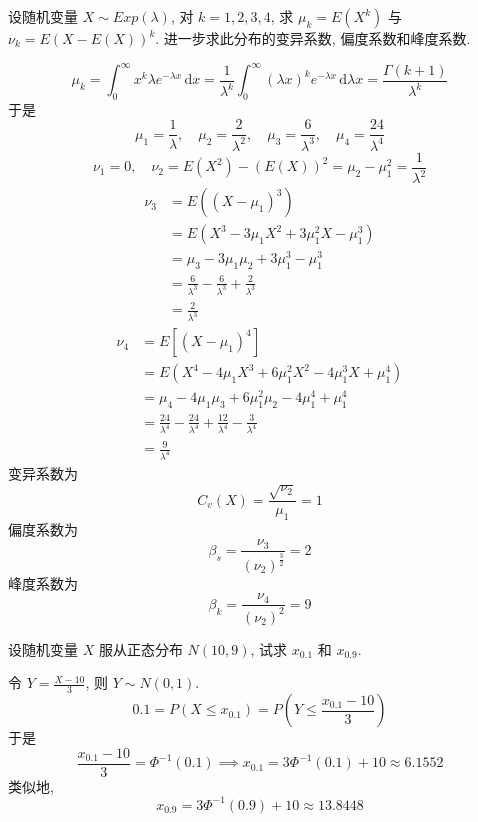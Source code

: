 \documentclass[../main.tex]{subfiles}
\begin{document}
\begin{exercise}{}{}
设随机变量 $X \sim Exp(\lambda)$, 对 $k=1,2,3,4$, 求 $\mu_k = E(X^k)$ 与 $\nu_k = E(X - E(X))^k$. 进一步求此分布的变异系数, 偏度系数和峰度系数.
\end{exercise}
 \begin{solution}
    \[
 \mu _{k}=  \int_{0}^{\infty}x^{k}  \lambda e^{-\lambda x}\,\mathrm{d} x= \frac{1 }{ \lambda ^{k} } \int_{0}^{\infty}\left(  \lambda x \right)^{k}e^{- \lambda x}\,\mathrm{d}  \lambda x=  \frac{ \Gamma \left( k+ 1 \right)  }{  \lambda ^{k}}   
 \]于是 \[
 \mu _1 = \frac{1 }{ \lambda  },\quad \mu _2 = \frac{2 }{ \lambda ^{2} },\quad \mu _3 = \frac{6 }{ \lambda ^{3} },\quad \mu _4 = \frac{24 }{ \lambda ^{4} }    
 \] \[
 \nu _1 = 0,\quad \nu _2 = E\left( X^{2} \right)-\left( E\left( X \right)  \right)^{2}= \mu _2 -\mu _1 ^{2}= \frac{1 }{ \lambda ^{2} }   
 \] \[
\begin{aligned}
 \nu  _3& = E\left( \left( X-\mu _1  \right)^{3}  \right) \\ 
  &= E\left( X^{3}-3\mu _1 X^{2}+ 3\mu _1 ^{2}X - \mu _1 ^{3}\right)\\ 
   &= \mu _3 -3\mu _1 \mu _2 + 3\mu _1 ^{3} -\mu _1 ^{3}\\ 
    &= \frac{6 }{ \lambda ^{3} }- \frac{6 }{ \lambda ^{3} }  + \frac{2 }{ \lambda ^{3} }\\ 
     &= \frac{2 }{ \lambda ^{3} } 
\end{aligned}
 \] \[
 \begin{aligned}
 \nu _4 &= E\left[ \left( X-\mu _1  \right)^{4}  \right] \\ 
  &= E\left( X^{4}- 4\mu _1 X^{3}+ 6\mu _1 ^{2}X^{2} - 4\mu _1 ^{3}X+ \mu _1 ^{4}\right)\\ 
   &= \mu _4 -4\mu _1 \mu _3 + 6\mu _1 ^{2}\mu _2 -4\mu _1 ^{4}+ \mu _1 ^{4}\\ 
    &= \frac{24 }{ \lambda ^{4} }-\frac{24 }{ \lambda ^{4} }+ \frac{12 }{ \lambda ^{4} }-\frac{3 }{ \lambda ^{4} }\\ 
     &= \frac{9 }{ \lambda ^{4} }      
 \end{aligned} 
 \]变异系数为 \[
 C_{v}\left( X \right)= \frac{\sqrt{\nu _2 } }{\mu _1  }= 1  
 \]偏度系数为 \[
 \beta _{s} = \frac{ \nu _3 }{\left( \nu _2  \right)^{\frac{3 }{2 } }  }= 2 
 \]峰度系数为 \[
 \beta _k = \frac{\nu _4  }{\left( \nu _2  \right)^{2}  }= 9
 \]
 \end{solution}
 
\begin{exercise}{}{}
设随机变量 $X$ 服从正态分布 $N(10,9)$, 试求 $x_{0.1}$ 和 $x_{0.9}$.
\end{exercise}
\begin{solution}
      令 \(  Y= \frac{X-10 }{3 }   \), 则 \(  Y\sim N\left( 0,1 \right)   \). \[
    0.1= P\left( X\le x_{0.1} \right)=  P\left( Y\le \frac{x_{0.1}-10 }{3 }  \right) 
    \]  于是 \[
  \frac{  x_{0.1}-10 }{3 }= \Phi ^{-1} \left( 0.1 \right)\implies x_{0.1}= 3\Phi ^{-1} \left( 0.1 \right)+ 10   \approx 6.1552
    \]类似地, \[
    x_{0.9}= 3 \Phi  ^{-1} \left( 0.9 \right)+ 10 \approx 13.8448
    \]
\end{solution}
\end{document}
